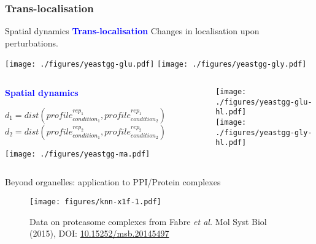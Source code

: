 \subsubsection{Trans-localisation}

\begin{frame}{Spatial dynamics}
  \textcolor{Blue}{\textbf{Trans-localisation}} Changes in
  localisation upon perturbations. 
  \begin{center}
    \texttt{[image: ./figures/yeastgg-glu.pdf]}
    \texttt{[image: ./figures/yeastgg-gly.pdf]} 
  \end{center}
\end{frame}


\begin{frame}
  \begin{columns}[t]
    \begin{column}[T]{0.5\textwidth}            
      \textcolor{Blue}{\textbf{Spatial dynamics}}
      \bigskip
      \begin{scriptsize}
        \center
        $d_1 = dist(profile_{condition_1}^{rep_1}, profile_{condition_2}^{rep_1})$
        $d_2= dist(profile_{condition_1}^{rep_2}, profile_{condition_2}^{rep_2})$         
      \end{scriptsize}
      \texttt{[image: ./figures/yeastgg-ma.pdf]}          
    \end{column}
    \begin{column}[T]{0.5\textwidth}            
      \texttt{[image: ./figures/yeastgg-glu-hl.pdf]}\\
      \texttt{[image: ./figures/yeastgg-gly-hl.pdf]} 
    \end{column}
  \end{columns}
\end{frame}



\begin{frame}{Beyond organelles: application to PPI/Protein complexes}

  \begin{figure}[t]
    \texttt{[image: figures/knn-x1f-1.pdf]}
    \caption{Data on proteasome complexes from Fabre \textit{et
        al.}  Mol Syst Biol (2015), DOI:
      \url{10.15252/msb.20145497}}
  \end{figure}

\end{frame}


